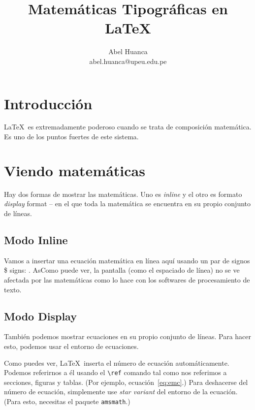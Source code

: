 \documentclass{article}
\begin{document}
\title{Matemáticas Tipográficas en \LaTeX}
\author{Abel Huanca \\ abel.huanca@upeu.edu.pe}
\maketitle


\section{Introducción} 
\LaTeX\ es extremadamente poderoso cuando se trata de composición matemática. Es uno de los puntos fuertes de este sistema. 

\section{Viendo matemáticas}
Hay dos formas de mostrar las matemáticas. Uno es  \emph{inline} y el otro es formato \emph{display} format -- en el que toda la matemática se encuentra en su propio conjunto de líneas.


\subsection{Modo Inline}
Vamos a insertar una ecuación matemática en línea aquí usando un par de signos \$ signs:    . AsComo puede ver, la pantalla (como el espaciado de línea) no se ve afectada por las matemáticas como lo hace con los softwares de procesamiento de texto.

\subsection{Modo Display}
También podemos mostrar ecuaciones en su propio conjunto de líneas. Para hacer esto, podemos usar el entorno de ecuaciones.

%

Como puedes ver, \LaTeX\ inserta el número de ecuación automáticamente. Podemos referirnos a él usando el \verb|\ref| comando tal como nos referimos a secciones, figuras y tablas. (Por ejemplo, ecuación~\ref{eq:emc}.) Para deshacerse del número de ecuación, simplemente use  \emph{star variant} del entorno de la ecuación. (Para esto, necesitas el paquete \texttt{amsmath}.)

%
\end{document}
